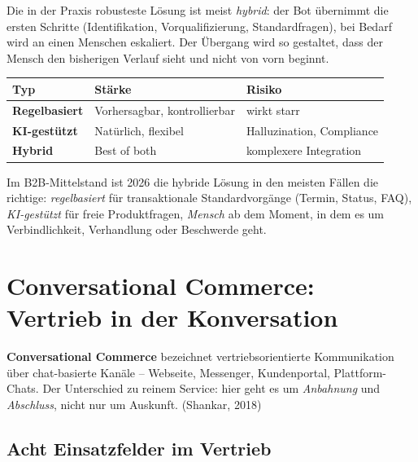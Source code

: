 \documentclass[11pt,a4paper,oneside]{article}
\newcommand{\fachbegriff}[1]{\textbf{#1}}
\newcommand{\quelle}[1]{{\footnotesize\color{lpGray}(#1)}}
\begin{document}
Die in der Praxis robusteste Lösung ist meist \emph{hybrid}: der Bot übernimmt die ersten Schritte (Identifikation, Vorqualifizierung, Standardfragen), bei Bedarf wird an einen Menschen eskaliert. Der Übergang wird so gestaltet, dass der Mensch den bisherigen Verlauf sieht und nicht von vorn beginnt.

\begin{tabularx}{\linewidth}{@{}>{\bfseries}lXX@{}}
\toprule
Typ & Stärke & Risiko \\
\midrule
Regelbasiert & Vorhersagbar, kontrollierbar & wirkt starr \\
KI-gestützt & Natürlich, flexibel & Halluzination, Compliance \\
Hybrid & Best of both & komplexere Integration \\
\bottomrule
\end{tabularx}

\begin{merkbox}
Im B2B-Mittelstand ist 2026 die hybride Lösung in den meisten Fällen die richtige: \emph{regelbasiert} für transaktionale Standardvorgänge (Termin, Status, FAQ), \emph{KI-gestützt} für freie Produktfragen, \emph{Mensch} ab dem Moment, in dem es um Verbindlichkeit, Verhandlung oder Beschwerde geht.
\end{merkbox}

\section{Conversational Commerce: Vertrieb in der Konversation}

\fachbegriff{Conversational Commerce} bezeichnet vertriebsorientierte Kommunikation über chat-basierte Kanäle -- Webseite, Messenger, Kundenportal, Plattform-Chats. Der Unterschied zu reinem Service: hier geht es um \emph{Anbahnung} und \emph{Abschluss}, nicht nur um Auskunft. \quelle{Shankar, 2018}

\subsection{Acht Einsatzfelder im Vertrieb}
\end{document}
